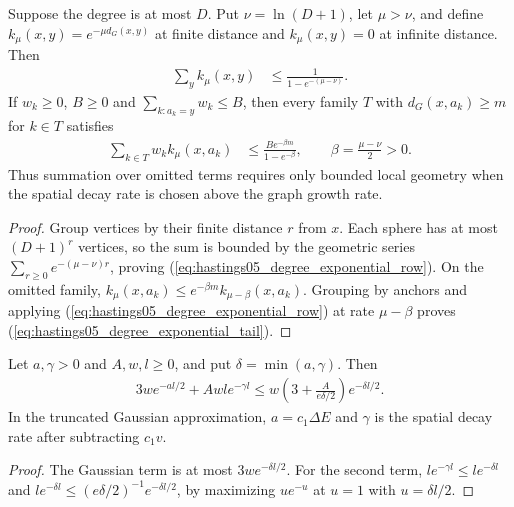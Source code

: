 \begin{lemma}
    \label{thm:hastings05_degree_weighted_tail}
    \leanok
    Suppose the degree is at most $D$. Put $\nu=\ln(D+1)$, let
    $\mu>\nu$, and define $k_\mu(x,y)=e^{-\mu d_G(x,y)}$ at finite
    distance and $k_\mu(x,y)=0$ at infinite distance. Then
    \begin{align}
        \sum_y k_\mu(x,y) & \le\frac1{1-e^{-(\mu-\nu)}}.
        \label{eq:hastings05_degree_exponential_row}
    \end{align}
    If $w_k\ge0$, $B\ge0$ and $\sum_{k:a_k=y}w_k\le B$,
    then every family $T$ with $d_G(x,a_k)\ge m$ for $k\in T$ satisfies
    \begin{align}
        \sum_{k\in T}w_k k_\mu(x,a_k)
         & \le\frac{B e^{-\beta m}}{1-e^{-\beta}},
        \qquad \beta=\frac{\mu-\nu}{2}>0.
        \label{eq:hastings05_degree_exponential_tail}
    \end{align}
    Thus summation over omitted terms requires only bounded local geometry
    when the spatial decay rate is chosen above the graph growth rate.
\end{lemma}
\begin{proof}\leanok
    Group vertices by their finite distance $r$ from $x$. Each sphere has
    at most $(D+1)^r$ vertices, so the sum is bounded by the geometric
    series $\sum_{r\ge0}e^{-(\mu-\nu)r}$, proving
    (\ref{eq:hastings05_degree_exponential_row}). On the omitted family,
    $k_\mu(x,a_k)\le e^{-\beta m}k_{\mu-\beta}(x,a_k)$.
    Grouping by anchors and applying
    (\ref{eq:hastings05_degree_exponential_row}) at rate $\mu-\beta$
    proves (\ref{eq:hastings05_degree_exponential_tail}).
\end{proof}

\begin{lemma}
    \label{lem:hastings05_gaussian_decay_absorption}
    \leanok
    Let $a,\gamma>0$ and $A,w,l\ge0$, and put $\delta=\min(a,\gamma)$.
    Then
    \begin{align}
        3we^{-al/2}+Awl e^{-\gamma l}
        \le w\left(3+\frac{A}{e\delta/2}\right)e^{-\delta l/2}.
        \label{eq:hastings05_gaussian_decay_absorption}
    \end{align}
    In the truncated Gaussian approximation, $a=c_1\Delta E$ and
    $\gamma$ is the spatial decay rate after subtracting $c_1v$.
\end{lemma}
\begin{proof}\leanok
    The Gaussian term is at most $3we^{-\delta l/2}$. For the second term,
    $le^{-\gamma l}\le le^{-\delta l}$ and
    $le^{-\delta l}\le(e\delta/2)^{-1}e^{-\delta l/2}$, by maximizing
    $u e^{-u}$ at $u=1$ with $u=\delta l/2$.
\end{proof}

